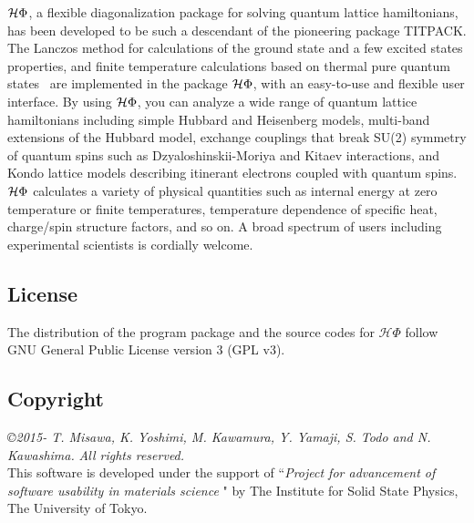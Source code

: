 $\mathcal{H} \Phi$, a flexible diagonalization package for solving quantum lattice hamiltonians,
has been developed to be such a descendant of the pioneering package TITPACK.
The Lanczos method for calculations of the ground state and a few excited states properties,
and finite temperature calculations based on thermal pure quantum states~\cite{Sugiura2012} are implemented in
the package $\mathcal{H} \Phi$, with an easy-to-use and flexible user interface.
By using $\mathcal{H} \Phi$, you can analyze a wide range of quantum lattice hamiltonians including
simple Hubbard and Heisenberg models, multi-band extensions of the Hubbard model,
exchange couplings that break SU(2) symmetry of quantum spins such as Dzyaloshinskii-Moriya
and Kitaev interactions, and Kondo lattice models describing itinerant electrons coupled with
quantum spins. $\mathcal{H} \Phi$ calculates a variety of physical quantities such as internal energy at zero temperature or finite temperatures, temperature dependence of specific heat, charge/spin structure factors, and so on. A broad spectrum of users including experimental scientists is cordially welcome.

\subsection{License}
The distribution of the program package and the source codes for ${\mathcal H \Phi}$ follow GNU General Public License version 3 (GPL v3). 
\subsection{Copyright}
{\it \copyright 2015- T. Misawa, K. Yoshimi, M. Kawamura, Y. Yamaji, S. Todo and N. Kawashima.} {\it  All rights reserved.}\\
This software is developed under the support of ``{\it Project for advancement of software usability in materials science }" by The Institute for Solid State Physics, The University of Tokyo. 
